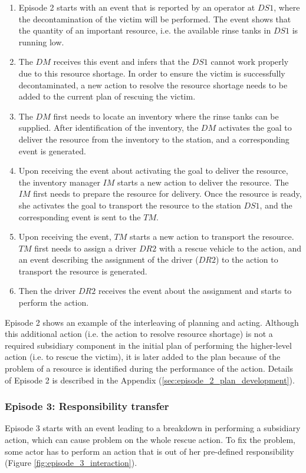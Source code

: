 \begin{enumerate}
	\item Episode 2 starts with an event that is reported by an operator at $DS1$, where the decontamination of the victim will be performed. The event shows that the quantity of an important resource, i.e. the available rinse tanks in $DS1$ is running low.
	\item The $DM$ receives this event and infers that the $DS1$ cannot work properly due to this resource shortage. In order to ensure the victim is successfully decontaminated, a new action to resolve the resource shortage needs to be added to the current plan of rescuing the victim.
	\item The $DM$ first needs to locate an inventory where the rinse tanks can be supplied. After identification of the inventory, the $DM$ activates the goal to deliver the resource from the inventory to the station, and a corresponding event is generated.
	\item Upon receiving the event about activating the goal to deliver the resource, the inventory manager $IM$ starts a new action to deliver the resource. The $IM$ first needs to prepare the resource for delivery. Once the resource is ready, she activates the goal to transport the resource to the station $DS1$, and the corresponding event is sent to the $TM$.
	\item Upon receiving the event, $TM$ starts a new action to transport the resource. $TM$ first needs to assign a driver $DR2$ with a rescue vehicle to the action, and an event describing the assignment of the driver ($DR2$) to the action to transport the resource is generated.
	\item Then the driver $DR2$ receives the event about the assignment and starts to perform the action.
\end{enumerate}

Episode 2 shows an example of the interleaving of planning and acting. Although this additional action (i.e. the action to resolve resource shortage) is not a required subsidiary component in the initial plan of performing the higher-level action (i.e. to rescue the victim), it is later added to the plan because of the problem of a resource is identified during the performance of the action. Details of Episode 2 is described in the Appendix (\ref{sec:episode_2_plan_development}).

\subsubsection{Episode 3: Responsibility transfer} %
\label{ssub:episode_3_responsibility_transfer}
Episode 3 starts with an event leading to a breakdown in performing a subsidiary action, which can cause problem on the whole rescue action. To fix the problem, some actor has to perform an action that is out of her pre-defined responsibility (Figure \ref{fig:episode_3_interaction}).

